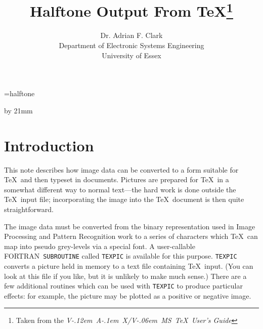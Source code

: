 
\font\halftone=halftone

\def\|#1|{{\tt#1}}
\def\mmax{M_{\hbox{\scriptsize max}}}
\def\SYSDEP#1{\marginpar{\scriptsize site\\ specific}}
\def\TL{{\tt\TeX lase}}
\def\TV{{\tt\TeX view}}
\def\VAX{\leavevmode\hbox{V\kern-.12em A\kern-.1em X}}
\def\VMS{\leavevmode\hbox{V\kern-.06em MS}}

\def\mc{\small}
\def\FORTRAN{{\mc FORTRAN}}

\nofiles
{}
\advance\textheight by 21mm

\title{Halftone Output From \TeX\footnote{Taken from the {\sl \VAX/\VMS\ \TeX\
       User's Guide}}}
\author{Dr. Adrian F. Clark\\
        Department of Electronic Systems Engineering\\
        University of Essex}


\maketitle

\section{Introduction}

This note describes how image data can be converted to a form suitable
for \TeX\ and then typeset in documents. Pictures are prepared for \TeX\
in a somewhat different way to normal text---the hard work is done outside
the \TeX\ input file; incorporating the image into the \TeX\ document is
then quite straightforward.

The image data must be converted from the binary representation used in Image
Processing and Pattern Recognition work to a series of characters which \TeX\
can map into pseudo grey-levels via a special font. A user-callable \FORTRAN\
\|SUBROUTINE| called \|TEXPIC| is available for this purpose. \|TEXPIC|
converts a picture held in memory to a text file containing \TeX\ input. (You
can look at this file if you like, but it is unlikely to make much sense.)
There are a few additional routines which can be used with \|TEXPIC| to produce
particular effects: for example, the picture may be plotted as a positive or
negative image. 

